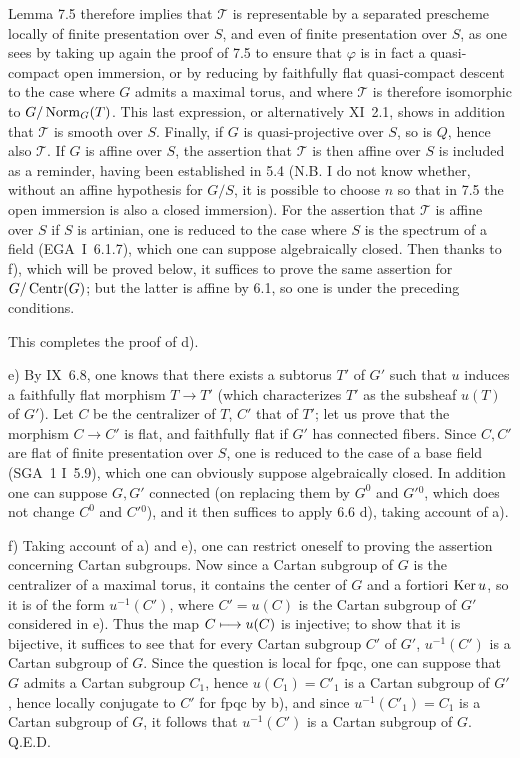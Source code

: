 Lemma 7.5 therefore implies that $\mathscr T$ is representable by a separated prescheme locally of finite presentation over $S$, and even of finite presentation over $S$, as one sees by taking up again the proof of 7.5 to ensure that $\varphi$ is in fact a quasi-compact open immersion, or by reducing by faithfully flat quasi-compact descent to the case where $G$ admits a maximal torus, and where $\mathscr T$ is therefore isomorphic to $G/\operatorname{Norm}_G(T)$. This last expression, or alternatively XI~2.1, shows in addition that $\mathscr T$ is smooth over $S$. Finally, if $G$ is quasi-projective over $S$, so is $Q$, hence also $\mathscr T$. If $G$ is affine over $S$, the assertion that $\mathscr T$ is then affine over $S$ is included as a reminder, having been established in 5.4 (N.B. I do not know whether, without an affine hypothesis for $G/S$, it is possible to choose $n$ so that in 7.5 the open immersion is also a closed immersion). For the assertion that $\mathscr T$ is affine over $S$ if $S$ is artinian, one is reduced to the case where $S$ is the spectrum of a field (EGA~I~6.1.7), which one can suppose algebraically closed. Then thanks to f), which will be proved below, it suffices to prove the same assertion for $G/\operatorname{Centr}(G)$; but the latter is affine by 6.1, so one is under the preceding conditions.

This completes the proof of d).

e) By IX~6.8, one knows that there exists a subtorus $T'$ of $G'$ such that $u$ induces a faithfully flat morphism $T\to T'$ (which characterizes $T'$ as the subsheaf $u(T)$ of $G'$). Let $C$ be the centralizer of $T$, $C'$ that of $T'$; let us prove that the morphism $C\to C'$ is flat, and faithfully flat if $G'$ has connected fibers. Since $C,C'$ are flat of finite presentation over $S$, one is reduced to the case of a base field (SGA~1 I~5.9), which one can obviously suppose algebraically closed. In addition one can suppose $G,G'$ connected (on replacing them by $G^0$ and $G'{}^0$, which does not change $C^0$ and $C'{}^0$), and it then suffices to apply 6.6 d), taking account of a).

f) Taking account of a) and e), one can restrict oneself to proving the assertion concerning Cartan subgroups. Now since a Cartan subgroup of $G$ is the centralizer of a maximal torus, it contains the center of $G$ and a fortiori $\operatorname{Ker} u$, so it is of the form $u^{-1}(C')$, where $C'=u(C)$ is the Cartan subgroup of $G'$ considered in e). Thus the map $C\longmapsto u(C)$ is injective; to show that it is bijective, it suffices to see that for every Cartan subgroup $C'$ of $G'$, $u^{-1}(C')$ is a Cartan subgroup of $G$. Since the question is local for fpqc, one can suppose that $G$ admits a Cartan subgroup $C_1$, hence $u(C_1)=C'_1$ is a Cartan subgroup of $G'$, hence locally conjugate to $C'$ for fpqc by b), and since $u^{-1}(C'_1)=C_1$ is a Cartan subgroup of $G$, it follows that $u^{-1}(C')$ is a Cartan subgroup of $G$. \hfill Q.E.D.

